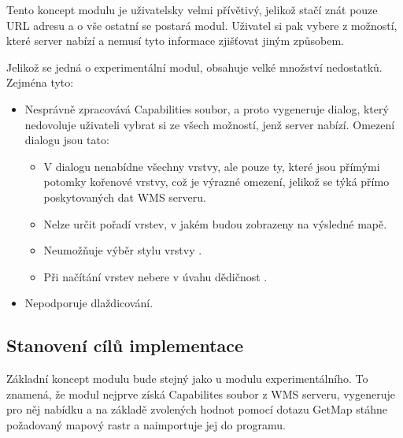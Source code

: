 \documentclass[a4paper,12pt]{article}
\begin{document}
Tento koncept modulu je uživatelsky velmi přívětivý, jelikož stačí
znát pouze URL adresu a o vše ostatní se postará modul. Uživatel si
pak vybere z možností, které server nabízí a nemusí tyto informace
zjišťovat jiným způsobem.


Jelikož se jedná o experimentální modul, obsahuje velké množství
nedostatků. Zejména tyto:

\begin{itemize}
\item Nesprávně zpracovává Capabilities soubor, a proto vygeneruje
  dialog, který nedovoluje uživateli vybrat si ze všech možností, jenž
  server nabízí. Omezení dialogu jsou tato:
\begin{itemize}
 \item V dialogu nenabídne všechny vrstvy, ale pouze ty, které jsou
   přímými potomky kořenové vrstvy, což je výrazné omezení, jelikož se
   týká přímo poskytovaných dat WMS serveru.
 \item Nelze určit pořadí vrstev, v jakém budou zobrazeny na výsledné
   mapě.
 \item Neumožňuje výběr stylu vrstvy .
 \item Při načítání vrstev nebere v úvahu dědičnost .
\end{itemize}
\item Nepodporuje dlaždicování.
\end{itemize}


 
\subsection{Stanovení cílů implementace}


Základní koncept modulu bude stejný jako u modulu experimentálního. To
znamená, že modul nejprve získá Capabilites soubor z WMS serveru,
vygeneruje pro něj nabídku a na základě zvolených hodnot pomocí dotazu
GetMap stáhne požadovaný mapový rastr a naimportuje jej do programu.
\end{document}
